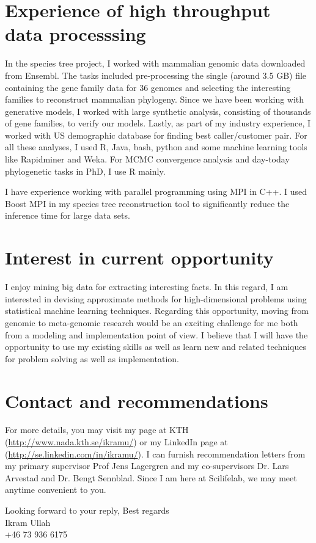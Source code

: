 \documentclass[margin, 10pt] {report}
\begin{document}
\section*{Experience of high throughput data processsing}
In the species tree project, I worked with mammalian genomic data downloaded from Ensembl. The tasks included pre-processing the single (around 3.5 GB) file containing the gene family data for 36 genomes and selecting the interesting families to reconstruct mammalian phylogeny. Since we have been working with generative models, I worked with large synthetic analysis, consisting of thousands of gene families, to verify our models. Lastly, as part of my industry experience, I worked with US demographic database for finding best caller/customer pair. For all these analyses, I used R, Java, bash, python and some machine learning tools like Rapidminer and Weka. For MCMC convergence analysis and day-today phylogenetic tasks in PhD, I use R mainly.    

I have experience working with parallel programming using MPI in C++. I used Boost MPI in my species tree reconstruction tool to significantly reduce the inference time for large data sets. 

\section*{Interest in current opportunity}
I enjoy mining big data for extracting interesting facts. In this regard, I am interested in devising approximate methods for high-dimensional problems using statistical machine learning techniques.
Regarding this opportunity, moving from genomic to meta-genomic research would be an exciting challenge for me both from a modeling and implementation point of view. I believe that I will have the opportunity to use my existing skills as well as learn new and related techniques for problem solving as well as implementation.

\section*{Contact and recommendations}
For more details, you may visit my page at KTH (\url{http://www.nada.kth.se/ikramu/}) or my LinkedIn page at (\url{http://se.linkedin.com/in/ikramu/}). I can furnish recommendation letters from my primary supervisor Prof Jens Lagergren and my co-supervisors Dr. Lars Arvestad and Dr. Bengt Sennblad. Since I am here at Scilifelab, we may meet anytime convenient to you. 

\hfill \break
Looking forward to your reply,
\hfill \break
Best regards \\
Ikram Ullah \\
+46 73 936 6175
\end{document}
